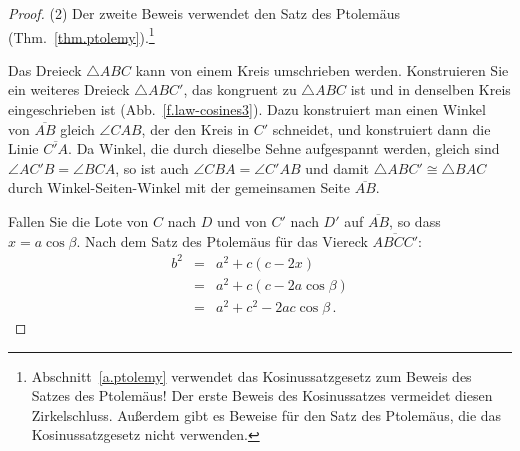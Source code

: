 \begin{proof}(2)
Der zweite Beweis verwendet den Satz des Ptolemäus (Thm.~\ref{thm.ptolemy}).\footnote{Abschnitt~\ref{a.ptolemy} verwendet das Kosinussatzgesetz zum Beweis des Satzes des Ptolemäus! Der erste Beweis des Kosinussatzes vermeidet diesen Zirkelschluss. Außerdem gibt es Beweise für den Satz des Ptolemäus, die das Kosinussatzgesetz nicht verwenden.}

Das Dreieck $\triangle ABC$ kann von einem Kreis umschrieben werden. 
Konstruieren Sie ein weiteres Dreieck $\triangle ABC'$, das kongruent zu $\triangle ABC$ ist und in denselben Kreis eingeschrieben ist (Abb.~\ref{f.law-cosines3}). Dazu konstruiert man einen Winkel von $\overline{AB}$ gleich $\angle CAB$, der den Kreis in $C'$ schneidet, und konstruiert dann die Linie $\overline{C'A}$.
Da Winkel, die durch dieselbe Sehne aufgespannt werden, gleich sind $\angle AC'B =\angle BCA$, so ist auch $\angle CBA=\angle C'AB$ und damit $\triangle ABC'\cong\triangle BAC$ durch Winkel-Seiten-Winkel mit der gemeinsamen Seite $\overline{AB}$.

Fallen Sie die Lote von $C$ nach $D$ und von $C'$ nach $D'$ auf $\overline{AB}$, so dass $x=a\cos \beta$. Nach dem Satz des Ptolemäus für das Viereck $\overline{ABCC'}$:
\begin{eqnarray*}
b^2&=&a^2+c(c-2x)\\
&=& a^2 + c(c-2a\cos\beta)\\
&=&a^2+c^2-2ac\cos\beta\,.
\end{eqnarray*}
\end{proof}

